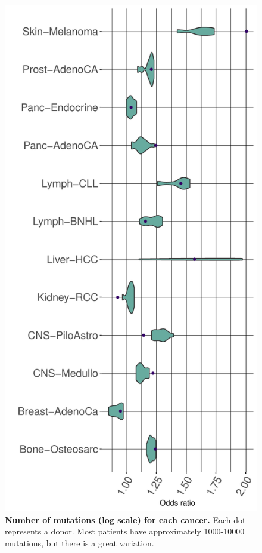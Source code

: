 \begin{figure}[h!]
    \centering
    \includegraphics[scale=0.66]{graphics/mixed_or_violin_by_row.pdf}
    \caption{\textbf{Number of mutations (log scale) for each cancer.} Each dot represents a donor. Most patients have approximately 1000-10000 mutations, but there is a great variation.}
    \label{fig:mixed_or_byrow}
\end{figure}
